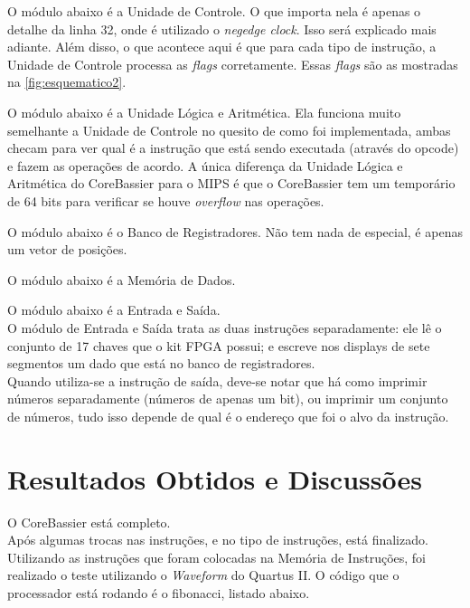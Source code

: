 \documentclass[
	12pt,
	openright,
	a4paper,
	english,			
	french,				
	spanish,			
	brazil,				
	]{abntex2}
\begin{document}
\label{code:InstructionsMemory.v}
 

O módulo abaixo é a Unidade de Controle. O que importa nela é apenas o detalhe da linha 32, onde é utilizado o \emph{negedge clock}. Isso será explicado mais adiante.
Além disso, o que acontece aqui é que para cada tipo de instrução, a Unidade de Controle processa as \emph{flags} corretamente. Essas \emph{flags} são as mostradas na \autoref{fig:esquematico2}.
\label{code:ControlUnit.v}
 

O módulo abaixo é a Unidade Lógica e Aritmética. Ela funciona muito semelhante a Unidade de Controle no quesito de como foi implementada, ambas 
checam para ver qual é a instrução que está sendo executada (através do opcode) e fazem as operações de acordo. A única diferença da Unidade Lógica e Aritmética do CoreBassier para o MIPS é que 
o CoreBassier tem um temporário de 64 bits para verificar se houve \emph{overflow} nas operações.
\label{code:ALU.v}
 

O módulo abaixo é o Banco de Registradores. Não tem nada de especial, é apenas um vetor de posições.
\label{code:RegistersBank.v}
 

O módulo abaixo é a Memória de Dados.
\label{code:DataMemory.v}
 

O módulo abaixo é a Entrada e Saída.\\
O módulo de Entrada e Saída trata as duas instruções separadamente: ele lê o conjunto de 17 chaves que o kit FPGA possui; e
escreve nos displays de sete segmentos um dado que está no banco de registradores.\\
Quando utiliza-se a instrução de saída, deve-se notar que há como imprimir números separadamente (números de apenas um bit), ou imprimir um conjunto de números,
tudo isso depende de qual é o endereço que foi o alvo da instrução.\\
\label{code:IO.v}
 


\chapter{Resultados Obtidos e Discussões}
O CoreBassier está completo.\\
Após algumas trocas nas instruções, e no tipo de instruções, está finalizado.
Utilizando as instruções que foram colocadas na Memória de Instruções,
foi realizado o teste utilizando o \emph{Waveform} do Quartus II. 
O código que o processador está rodando é o fibonacci, listado abaixo.
\end{document}
